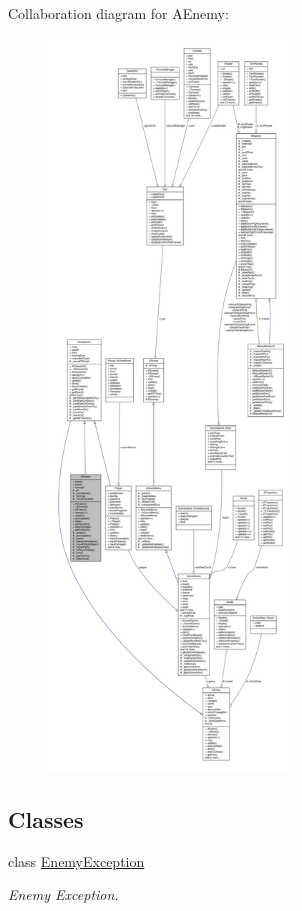 Collaboration diagram for A\+Enemy\+:
\nopagebreak
\begin{figure}[H]
\begin{center}
\leavevmode
\includegraphics[height=550pt]{class_a_enemy__coll__graph}
\end{center}
\end{figure}
\subsection*{Classes}
\begin{DoxyCompactItemize}
\item 
class \hyperlink{class_a_enemy_1_1_enemy_exception}{Enemy\+Exception}
\begin{DoxyCompactList}\small\item\em Enemy Exception. \end{DoxyCompactList}\end{DoxyCompactItemize}
